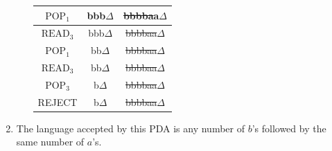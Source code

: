 \begin{solution}
\begin{enumerate}[label=\alph*)]
\begin{enumerate}[label=\arabic*)]
\begin{table}[H]
\begin{tabular}{|c|c|c|}
                    \hline
                    $\text{POP}_1$ & bbb$\Delta$ &\sout{bbbba}a$\Delta$\\
                    \hline
                    $\text{READ}_3$ & bbb$\Delta$ & \sout{bbbbaa}$\Delta$\\
                    \hline
                    $\text{POP}_1$ & bb$\Delta$ &\sout{bbbbaa}$\Delta$\\
                    \hline
                    $\text{READ}_3$ & bb$\Delta$ & \sout{bbbbaa$\Delta$}\\
                    \hline
                    $\text{POP}_3$ & b$\Delta$ &\sout{bbbbaa$\Delta$}\\
                    \hline
                    REJECT & b$\Delta$ &\sout{bbbbaa$\Delta$}\\
                    \hline
                \end{tabular}
            \end{table}
        \end{enumerate}
        \item The language accepted by this PDA is any number of $b$'s followed by the same number of $a$'s.
    \end{enumerate}
\end{solution}

